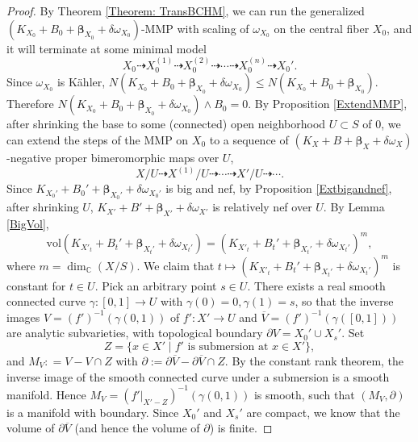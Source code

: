 \documentclass[12pt]{amsart}
\numberwithin{equation}{section}
\theoremstyle{definition}
\theoremstyle{plain}
\newtheorem*{thm A*}{Theorem A}
\newtheorem*{thm B*}{Theorem B}
\newtheorem*{thm C*}{Theorem C}
\newtheorem*{thm D*}{Theorem D}
\theoremstyle{definition}
\renewcommand{\1}{\mathds{1}}
\newcommand{\bbeta}{\boldsymbol{\beta}}
\renewcommand{\>}{\rightarrow}
\begin{document}
\begin{proof}
By Theorem \ref{Theorem: TransBCHM}, we can run the generalized $(K_{X_0}+B_0 + { \bbeta}_{X_0} +  \delta {\omega}_{X_0})$-MMP with scaling of $\omega_{X_0}$ on the central fiber $X_0$, and it will terminate at some minimal model
$$X_0 \dashrightarrow X_0^{(1)} \dashrightarrow X_0^{(2)} \dashrightarrow \cdots \dashrightarrow X_0^{(n)} \dashrightarrow X_0'.$$
Since $\omega _{X_0}$ is K\"ahler, $N(K_{X_0} + B_0 + \bbeta_{X_0}+ \delta{\omega}_{X_0}) \le  N(K_{X_0} + B_0 + \bbeta_{X_0})$. Therefore $N(K_{X_0} + B_0 + \bbeta_{X_0}+ \delta{\omega}_{X_0})\wedge B_0 = 0$. By Proposition \ref{ExtendMMP}, after shrinking the base to some (connected) open neighborhood $U \subset S$ of $0$, we can extend the steps of the MMP on $X_0$ to a sequence of $(K_X+B+\bbeta_X+ \delta{\omega}_X)$-negative proper bimeromorphic maps over $U$, $$X /U \dashrightarrow X^{(1)}/U \dashrightarrow \cdots \dashrightarrow X'/U\dashrightarrow \cdots.$$
Since $K_{X_0'}  + B_0' +  { \bbeta}_{X_0'}+ \delta {\omega}_{X_0'}$ is big and nef, by Proposition \ref{Extbigandnef}, after shrinking $U$, $K_{X'} +B' +  { \bbeta}_{X'} + \delta {\omega}_{X'}$ is relatively nef over $U$. By Lemma \ref{BigVol}, $$\mathrm{vol}(K_{X'_t}+ B_t' +  { \bbeta}_{X_t'}+\delta {\omega}_{X_t'}) = (K_{X'_t}+ B_t' +  { \bbeta}_{X_t'} + \delta {\omega}_{X_t'})^m,$$where  $m = \dim_{\mathbb{C}}(X/S)$. 
We claim that $t \longmapsto(K_{X'_t} + B_t' +  { \bbeta}_{X_t'}+ \delta {\omega}_{X_t'})^m$ is constant for $t\in U$. Pick an arbitrary point $s\in U$. There exists a real smooth connected curve $\gamma: [0,1] \to U$ with  $\gamma(0) = 0,\gamma(1) = s$, so that the inverse images $V = (f')^{-1}(\gamma(0,1))$ of $f':X'\to U$ and  $\overline{V} = (f')^{-1}(\gamma([0,1]))$ are analytic subvarieties, with topological boundary $\partial V = X_0 '\cup X_s'$. Set $$Z = \{x\in X' \mid f' \text{ is submersion at } x\in X' \},$$ and $M_V : = {V} - {V} \cap Z$ with $\partial   :=  \partial \overline{V} - \partial \overline{V} \cap Z$. By the constant rank theorem, the inverse image of the smooth connected curve under a submersion is a smooth manifold. Hence $M_V = (f'|_{X'- Z})^{-1}(\gamma (0,1))$
is smooth, such that $(M_V ,\partial )$ is a manifold with boundary. Since $X_0'$ and $X_s'$ are compact, we know that the volume of $\partial \overline{V}$ (and hence the volume of $\partial$) is finite. 
    

\end{proof}
\end{document}
